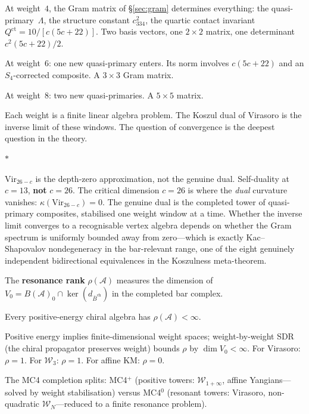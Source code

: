\documentclass[11pt]{article}
\newcommand{\cA}{\mathcal{A}}
\newcommand{\cW}{\mathcal{W}}
\newcommand{\barBch}{\bar{B}^{\mathrm{ch}}}
\newcommand{\sep}{\bigskip\begin{center}$*$\end{center}\medskip}
\begin{document}
At weight~$4$, the Gram matrix of \S\ref{sec:gram} determines
everything: the quasi-primary~$\Lambda$, the structure constant
$c_{334}^2$, the quartic contact invariant
$Q^{\mathrm{ct}} = 10/[c(5c+22)]$.  Two basis vectors, one
$2 \times 2$ matrix, one determinant $c^2(5c+22)/2$.

At weight~$6$: one new quasi-primary enters.  Its norm
involves $c(5c+22)$ and an $S_4$-corrected composite.  A
$3 \times 3$ Gram matrix.

At weight~$8$: two new quasi-primaries.  A $5 \times 5$ matrix.

Each weight is a finite linear algebra problem.  The Koszul
dual of Virasoro is the inverse limit of these windows.  The
question of convergence is the deepest question in the theory.

\sep

$\mathrm{Vir}_{26-c}$ is the depth-zero approximation, not
the genuine dual.  Self-duality at $c = 13$, \textbf{not}
$c = 26$.  The critical dimension $c = 26$ is where the
\textit{dual} curvature vanishes:
$\kappa(\mathrm{Vir}_{26-c}) = 0$.  The genuine dual is
the completed tower of quasi-primary composites, stabilised
one weight window at a time.  Whether the inverse limit
converges to a recognisable vertex algebra depends on whether
the Gram spectrum is uniformly bounded away from zero---which
is exactly Kac--Shapovalov nondegeneracy in the bar-relevant
range, one of the eight genuinely independent bidirectional
equivalences in the Koszulness meta-theorem.

\medskip

The \textbf{resonance rank} $\rho(\cA)$ measures the
dimension of $V_0 = B(\cA)_0 \cap \ker(d_{\barBch})$ in the
completed bar complex.

\begin{theorem}
Every positive-energy chiral algebra has
$\rho(\cA) < \infty$.
\end{theorem}

\noindent
Positive energy implies finite-dimensional weight spaces;
weight-by-weight SDR (the chiral propagator preserves weight)
bounds $\rho$ by $\dim V_0 < \infty$.  For Virasoro:
$\rho = 1$.  For $\cW_3$: $\rho = 1$.  For affine KM:
$\rho = 0$.

The MC4 completion splits: MC4${}^+$ (positive towers:
$\cW_{1+\infty}$, affine Yangians---solved by weight
stabilisation) versus MC4${}^0$ (resonant towers: Virasoro,
non-quadratic $\cW_N$---reduced to a finite resonance problem).
\end{document}
